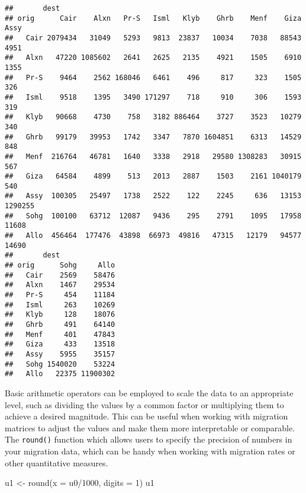 \documentclass[
]{book}
\newenvironment{Shaded}{\begin{snugshade}}{\end{snugshade}}
\newcommand{\AttributeTok}[1]{\textcolor[rgb]{0.77,0.63,0.00}{#1}}
\newcommand{\DecValTok}[1]{\textcolor[rgb]{0.00,0.00,0.81}{#1}}
\newcommand{\FunctionTok}[1]{\textcolor[rgb]{0.00,0.00,0.00}{#1}}
\newcommand{\NormalTok}[1]{#1}
\newcommand{\OtherTok}[1]{\textcolor[rgb]{0.56,0.35,0.01}{#1}}
\newcommand{\SpecialCharTok}[1]{\textcolor[rgb]{0.00,0.00,0.00}{#1}}
\begin{document}
\begin{verbatim}
##       dest
## orig      Cair    Alxn   Pr-S   Isml   Klyb    Ghrb    Menf    Giza    Assy
##   Cair 2079434   31049   5293   9813  23837   10034    7038   88543    4951
##   Alxn   47220 1085602   2641   2625   2135    4921    1505    6910    1355
##   Pr-S    9464    2562 168046   6461    496     817     323    1505     326
##   Isml    9518    1395   3490 171297    718     910     306    1593     319
##   Klyb   90668    4730    758   3182 886464    3727    3523   10279     340
##   Ghrb   99179   39953   1742   3347   7870 1604851    6313   14529     848
##   Menf  216764   46781   1640   3338   2918   29580 1308283   30915     567
##   Giza   64584    4899    513   2013   2887    1503    2161 1040179     540
##   Assy  100305   25497   1738   2522    122    2245     636   13153 1290255
##   Sohg  100100   63712  12087   9436    295    2791    1095   17958   11608
##   Allo  456464  177476  43898  66973  49816   47315   12179   94577   14690
##       dest
## orig      Sohg     Allo
##   Cair    2569    58476
##   Alxn    1467    29534
##   Pr-S     454    11184
##   Isml     263    10269
##   Klyb     128    18076
##   Ghrb     491    64140
##   Menf     401    47843
##   Giza     433    13518
##   Assy    5955    35157
##   Sohg 1540020    53224
##   Allo   22375 11900302
\end{verbatim}

Basic arithmetic operators can be employed to scale the data to an appropriate level, such as dividing the values by a common factor or multiplying them to achieve a desired magnitude. This can be useful when working with migration matrices to adjust the values and make them more interpretable or comparable. The \texttt{round()} function which allows users to specify the precision of numbers in your migration data, which can be handy when working with migration rates or other quantitative measures.

\begin{Shaded}
\begin{Highlighting}[]
\NormalTok{u1 }\OtherTok{\textless{}{-}} \FunctionTok{round}\NormalTok{(}\AttributeTok{x =}\NormalTok{ u0}\SpecialCharTok{/}\DecValTok{1000}\NormalTok{, }\AttributeTok{digits =} \DecValTok{1}\NormalTok{)}
\NormalTok{u1}
\end{Highlighting}
\end{Shaded}
\end{document}
